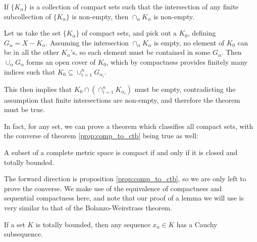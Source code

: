 \begin{btheorem}{}{}
If $\{K_{\alpha}\}$ is a collection of compact sets such that the intersection of any finite subcollection of $\{K_{\alpha}\}$ is non-empty, then $\cap_{\alpha} K_{\alpha}$ is non-empty.
\end{btheorem}
\begin{bproof}{}{}
Let us take the set $\{K_{\alpha}\}$ of compact sets, and pick out a $K_{0}$, defining $G_{\alpha} = X -  K_{\alpha}$. Assuming the intersection $\cap_{\alpha} K_{\alpha}$ is empty, no element of $K_{0}$ can be in all the other $K_{\alpha}$'s, so each element must be contained in some $G_{\alpha}$. Then $\cup_{\alpha} G_{\alpha}$ forms an open cover of $K_{0}$, which by compactness provides finitely many indices such that $K_{0} \subseteq \cup_{i=1}^{n} G_{\alpha_{i}}$.

This then implies that $K_{0} \cap \left( \cap_{i=1}^{n} K_{\alpha_{i}} \right)$ must be empty, contradicting the assumption that finite intersections are non-empty, and therefore the theorem must be true.
\eop
\end{bproof}

In fact, for any set, we can prove a theorem which classifies all compact sets, with the converse of theorem \ref{prop:comp_to_ctb} being true as well:
\begin{bprop}{}{}
A subset of a complete metric space is compact if and only if it is closed and totally bounded.
\end{bprop}

The forward direction is proposition \ref{prop:comp_to_ctb}, so we are only left to prove the converse. We make use of the equivalence of compactness and sequential compactness here, and note that our proof of a lemma we will use is very similar to that of the Bolanzo-Weirstrass theorem.

\begin{blemma}{}{}
If a set $K$ is totally bounded, then any sequence $x_{n} \in K$ has a Cauchy subsequence.
\end{blemma}

